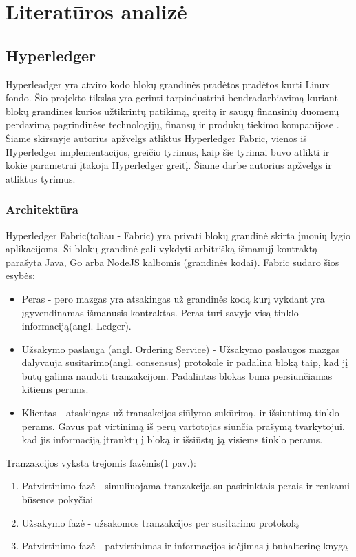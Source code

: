 \documentclass{VUMIFPSkursinis}
\begin{document}
\section{Literatūros analizė}
	\subsection{Hyperledger}
		Hyperleadger yra atviro kodo blokų grandinės pradėtos pradėtos kurti Linux fondo. Šio projekto tikslas yra gerinti tarpindustrini bendradarbiavimą kuriant blokų grandines kurios užtikrintų 
		patikimą, greitą ir saugų finansinių duomenų perdavimą pagrindinėse technologijų, finansų ir produkų tiekimo kompanijose \cite{LinuxHyper}. Šiame skirsnyje autorius apžvelgs 
		atliktus Hyperledger Fabric, vienos iš Hyperledger implementacijos, greičio tyrimus, kaip šie tyrimai buvo atlikti ir kokie parametrai įtakoja Hyperledger greitį. Šiame darbe autorius apžvelgs \cite{ThailandPerf} ir \cite{IMBResearch} atliktus tyrimus.
		
		\subsubsection{Architektūra}
			Hyperledger Fabric(toliau - Fabric) yra privati blokų grandinė skirta įmonių lygio aplikacijoms. 
			Ši blokų grandinė gali vykdyti arbitrišką išmanujį kontraktą parašyta Java, Go arba NodeJS kalbomis (grandinės kodai).
			Fabric sudaro šios esybės:
			\begin{itemize}
				\item{Peras - pero mazgas yra atsakingas už grandinės kodą kurį vykdant yra įgyvendinamas išmanusis kontraktas. 
 Peras turi savyje visą tinklo informaciją(angl. Ledger). }
				\item{Užsakymo paslauga (angl. Ordering Service) - Užsakymo paslaugos mazgas dalyvauja susitarimo(angl. consensus) 
protokole ir padalina bloką taip, kad jį būtų galima naudoti tranzakcijom. Padalintas blokas būna persiunčiamas kitiems perams.}
				\item{Klientas - atsakingas už transakcijos siūlymo sukūrimą, ir išsiuntimą tinklo perams. Gavus pat virtinimą iš perų vartotojas siunčia prašymą tvarkytojui, kad jis informaciją įtrauktų į bloką ir išsiūstų ją visiems tinklo perams.}
			\end{itemize}

Tranzakcijos vyksta trejomis fazėmis(1 pav.):
			\begin{enumerate}
				\item{Patvirtinimo fazė - simuliuojama tranzakcija su pasirinktais perais ir renkami būsenos pokyčiai}
				\item{Užsakymo fazė - užsakomos tranzakcijos per susitarimo protokolą}
				\item{Patvirtinimo fazė - patvirtinimas ir informacijos įdėjimas į buhalterinę knygą }
			\end{enumerate}
\end{document}
